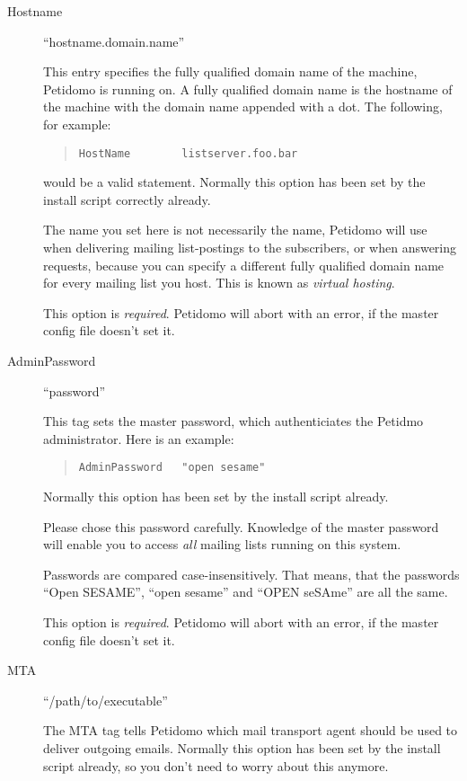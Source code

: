 \documentclass[a4paper,11pt]{scrreprt}
\newcommand{\Def}[1]{{\textsl{#1}}}
\begin{document}
\begin{description}

\item[Hostname] \hfill ``hostname.domain.name''

This entry specifies the fully qualified domain name of the machine,
Petidomo is running on. A fully qualified domain name is the
hostname of the machine with the domain name appended with a dot. The
following, for example:
\begin{quote}
\begin{verbatim}
HostName        listserver.foo.bar
\end{verbatim}
\end{quote}
would be a valid statement. Normally this option has been set by the
install script correctly already.

The name you set here is not necessarily the name, Petidomo will use
when delivering mailing list-postings to the subscribers, or when
answering requests, because you can specify a different fully
qualified domain name for every mailing list you host. This is known
as \Def{virtual hosting}.

This option is \emph{required}. Petidomo will abort with an error,
if the master config file doesn't set it.

\item[AdminPassword] \hfill ``password''

This tag sets the master password, which authenticiates the Petidmo
administrator. Here is an example:
\begin{quote}
\begin{verbatim}
AdminPassword   "open sesame"
\end{verbatim}
\end{quote}
Normally this option has been set by the install script already.

Please chose this password carefully. Knowledge of the master password
will enable you to access \emph{all} mailing lists running on this
system.

Passwords are compared case-insensitively. That means, that the
passwords ``Open SESAME'', ``open sesame'' and ``OPEN seSAme'' are all
the same.

This option is \emph{required}. Petidomo will abort with an error,
if the master config file doesn't set it.


\item[MTA] \hfill ``/path/to/executable''

The MTA tag tells Petidomo which mail transport agent should be used
to deliver outgoing emails. Normally this option has been set by the
install script already, so you don't need to worry about this anymore.


\end{description}
\end{document}
